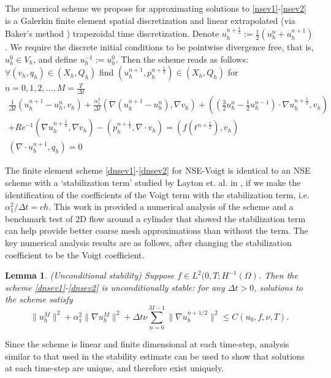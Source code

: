\documentclass[11pt]{article}%
\numberwithin{equation}{section}
\newtheorem{lemma}{Lemma}[section]
\begin{document}
The numerical scheme we propose for approximating solutions to \eqref{nsev1}-\eqref{nsev2} is 
a Galerkin finite element spatial discretization and linear extrapolated (via Baker's method \cite{Baker})
trapezoidal time discretization.  Denote $u_h^{n+\frac12}:=\frac12(u_h^n + u_h^{n+1})$.  We require the
discrete initial conditions to be pointwise divergence free, that is, $u_h^0\in V_h$, and define $u_h^{-1}:=u_h^0$.  Then the scheme reads as follows: $\forall (v_h,q_h) \in (X_h,Q_h)$ find $(u_h^{n+1},p_h^{n+\frac12})
\in (X_h,Q_h)$ for $n=0,1,2,...,M=\frac{T}{\Delta t}$
\begin{eqnarray}
\frac{1}{\Delta t}(u_{h}^{n+1}-u_{h}^{n},v_{h})
+ \frac{\alpha_1^2}{\Delta t}(\nabla (u_{h}^{n+1}- u_{h}^{n}),\nabla v_{h})
+ ((\frac32u_h^n - \frac12u_h^{n-1}) \cdot \nabla u_{h}^{n+\frac{1}{2}},v_{h})\nonumber\\
+Re^{-1}(\nabla u_{h}^{n+\frac{1}{2}},\nabla v_{h})
-(p_{h}^{n+\frac{1}{2}},\nabla\cdot v_{h})
=(f(t^{n+\frac{1}{2}}),v_{h})\label{dnsev1}\\
(\nabla\cdot u_{h}^{n+1},q_{h}) = 0\label{dnsev2}
\end{eqnarray}

The finite element scheme \eqref{dnsev1}-\eqref{dnsev2} for NSE-Voigt is identical to an NSE scheme with a `stabilization term' studied by Layton et. al. in \cite{LLMNR09}, if we make the identification of the coefficients of the Voigt term with
the stabilization term, i.e. $\alpha_1^2/\Delta t = ch$.
This  work in \cite{LLMNR09} provided a numerical analysis of the scheme and a benchmark test of 2D flow around a cylinder that showed the stabilization term can help provide better coarse mesh approximations than without the term.  The key numerical analysis results are as follows, after changing the stabilization coefficient to be the Voigt coefficient.

\begin{lemma} (Unconditional stability)
Suppose $f\in L^2(0,T;H^{-1}(\Omega)$.  Then the scheme \eqref{dnsev1}-\eqref{dnsev2} is unconditionally stable: for any $\Delta t>0$, solutions to the scheme satisfy
\[
\| u_h^M \|^2 + \alpha_1^2 \| \nabla u_h^M \|^2 + \Delta t\nu \sum_{n=0}^{M-1} \| \nabla u_h^{n+1/2} \|^2 \le C(u_0,f,\nu,T).
\]
\end{lemma}
Since the scheme is linear and finite dimensional at each time-step, analysis similar to that used in the stability estimate can be used to show that solutions at each time-step are unique, and therefore exist uniquely.
\end{document}
